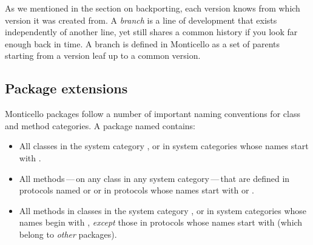\documentclass[a4paper,10pt,twoside]{book}
\begin{document}
As we mentioned in the section on backporting, each version knows from which version it was created from. A \emph{branch} is a line of development that exists independently of another line, yet still shares a common history if you look far enough back in time. A branch is defined in Monticello as a set of parents starting from a version leaf up to a common version.






\subsection{Package extensions}

 

Monticello packages follow a number of important naming conventions for class and method categories.
A package named  contains:

\begin{itemize}
\item All classes in the system category , or in system categories whose names start with .
\item All methods\,---\,on any class in any system category\,---\,that are defined in protocols named  or  or in protocols whose names start with  or .

\item All methods in classes in the system category , or in system categories whose names begin with , \emph{except} those in protocols whose names start with \prot{*} (\ie which belong to \emph{other} packages).
\end{itemize}
\end{document}
